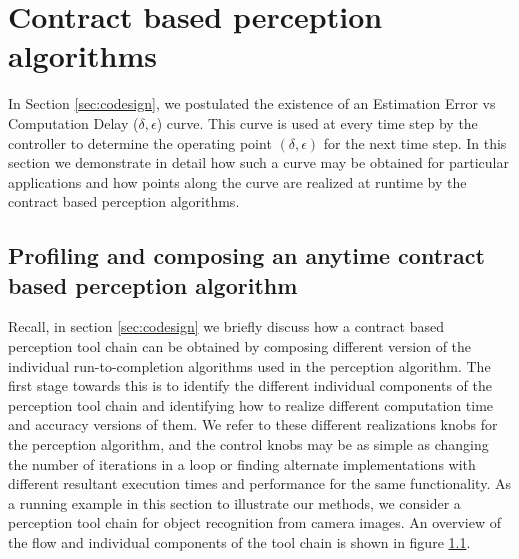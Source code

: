 \section{Contract based perception algorithms}
\label{delayErrorCurve}

In Section \ref{sec:codesign}, we postulated the existence of an Estimation Error vs Computation Delay ($\delta,\epsilon$) curve. %
This curve is used at every time step by the controller to determine the operating point $(\delta,\epsilon)$ for the next time step.
In this section we demonstrate in detail how such a curve may be obtained for particular applications and how points along the curve are realized at runtime by the contract based perception algorithms.

\subsection{Profiling and composing an anytime contract based perception algorithm}

Recall, in section \ref{sec:codesign} we briefly discuss how a contract based perception tool chain can be obtained by composing different version of the individual run-to-completion algorithms used in the perception algorithm. The first stage towards this is to identify the different individual components of the perception tool chain and identifying how to realize different computation time and accuracy versions of them. We refer to these different realizations  knobs for the perception algorithm, and the control knobs may be as simple as changing the number of iterations in a loop \cite{greenMS} or finding alternate implementations with different resultant execution times and performance for the same functionality. As a running example in this section to illustrate our methods, we consider a perception tool chain for object recognition from camera images. An overview of the flow and individual components of the tool chain is shown in figure \ref{}.


